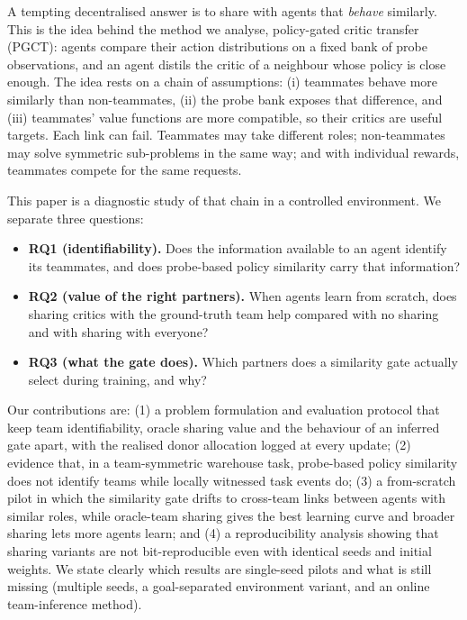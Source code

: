 \documentclass{article}
\begin{document}
A tempting decentralised answer is to share with agents that \emph{behave} similarly. This is the idea behind
the method we analyse, policy-gated critic transfer (PGCT): agents compare their action distributions on a fixed
bank of probe observations, and an agent distils the critic of a neighbour whose policy is close enough.
The idea rests on a chain of assumptions: (i) teammates behave more similarly than non-teammates, (ii) the
probe bank exposes that difference, and (iii) teammates' value functions are more compatible, so their critics
are useful targets. Each link can fail. Teammates may take different roles; non-teammates may solve
symmetric sub-problems in the same way; and with individual rewards, teammates compete for the same requests.

This paper is a diagnostic study of that chain in a controlled environment. We separate three questions:
\begin{itemize}
  \item \textbf{RQ1 (identifiability).} Does the information available to an agent identify its teammates, and
    does probe-based policy similarity carry that information?
  \item \textbf{RQ2 (value of the right partners).} When agents learn from scratch, does sharing critics with the
    ground-truth team help compared with no sharing and with sharing with everyone?
  \item \textbf{RQ3 (what the gate does).} Which partners does a similarity gate actually select during training,
    and why?
\end{itemize}

Our contributions are: (1) a problem formulation and evaluation protocol that keep team identifiability, oracle
sharing value and the behaviour of an inferred gate apart, with the realised donor allocation logged at every
update; (2) evidence that, in a team-symmetric warehouse task, probe-based policy similarity does not identify
teams while locally witnessed task events do; (3) a from-scratch pilot in which the similarity gate drifts to
cross-team links between agents with similar roles, while oracle-team sharing gives the best learning curve and
broader sharing lets more agents learn; and (4) a reproducibility analysis showing that sharing variants are not
bit-reproducible even with identical seeds and initial weights. We state clearly which results are single-seed
pilots and what is still missing (multiple seeds, a goal-separated environment variant, and an online
team-inference method).
\end{document}
